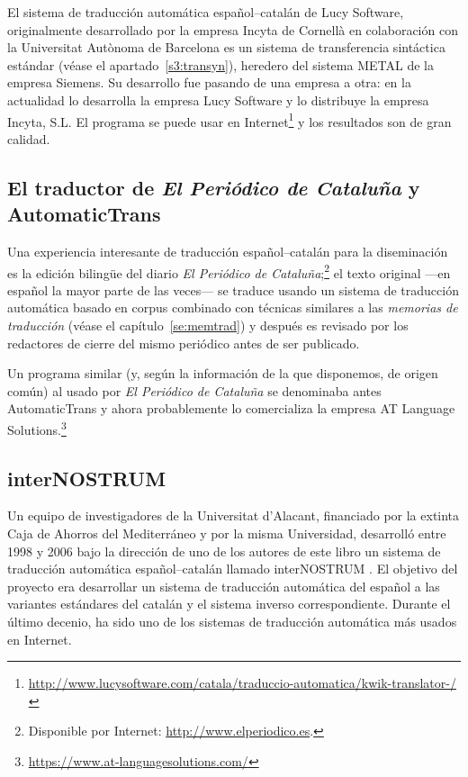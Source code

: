 El sistema de traducción automática español--catalán de Lucy Software, originalmente desarrollado por la empresa Incyta de Cornellà en colaboración con la Universitat Autònoma de Barcelona es un sistema de transferencia sintáctica estándar (véase el apartado~\ref{s3:transyn}), heredero del sistema METAL de la empresa Siemens. Su desarrollo fue pasando de una empresa a otra: en la actualidad lo desarrolla la empresa Lucy Software y lo distribuye la empresa Incyta, S.L. El programa se puede usar en Internet\footnote{\url{http://www.lucysoftware.com/catala/traduccio-automatica/kwik-translator-/}} y los resultados son de gran calidad. 

\subsection{El traductor de \emph{El Periódico de Cataluña} y AutomaticTrans} \label{ss:ePdC} 

Una experiencia interesante \citep{fiteperiodico} de traducción español--catalán para la diseminación es la edición bilingüe del diario \emph{El Periódico de Cataluña};\footnote{Disponible por Internet: \url{http://www.elperiodico.es}.} el texto original ---en español la mayor parte de las veces--- se traduce usando un sistema de traducción automática basado en corpus combinado con técnicas similares a las \emph{memorias de traducción} (véase el capítulo~\ref{se:memtrad}) y después es revisado por los redactores de cierre del mismo periódico antes de ser publicado. 

Un programa similar (y, según la información de la que disponemos, de origen común) al usado por \emph{El Periódico de Cataluña} se denominaba antes AutomaticTrans y ahora probablemente lo comercializa la empresa AT Language Solutions.\footnote{\url{https://www.at-languagesolutions.com/}} 

\subsection{interNOSTRUM} 

Un equipo de investigadores de la Universitat d'Alacant, financiado por la extinta Caja de Ahorros del Mediterráneo y por la misma Universidad, desarrolló entre 1998 y 2006 bajo la dirección de uno de los autores de este libro un sistema de traducción automática español--catalán llamado \textsf{interNOSTRUM} \citep{canals01a,canals01b}. El objetivo del proyecto era desarrollar un sistema de traducción automática del español a las variantes estándares del catalán y el sistema inverso correspondiente. Durante el último decenio, ha sido uno de los sistemas de traducción automática más usados en Internet. 

